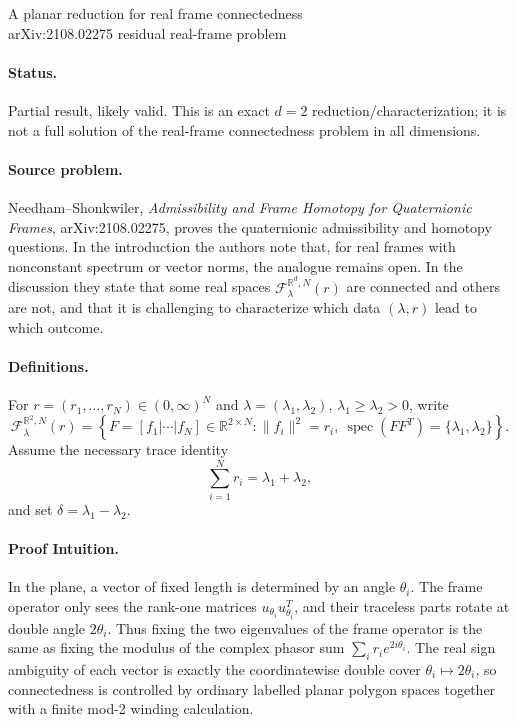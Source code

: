 \documentclass[11pt]{article}
\newcommand{\R}{\mathbb R}
\newcommand{\F}{\mathcal F}
\begin{document}
\begin{center}
{\Large A planar reduction for real frame connectedness}\\[4pt]
{\large arXiv:2108.02275 residual real-frame problem}
\end{center}

\paragraph{Status.}
Partial result, likely valid. This is an exact \(d=2\) reduction/characterization; it is not a full solution of the real-frame connectedness problem in all dimensions.

\paragraph{Source problem.}
Needham--Shonkwiler, \emph{Admissibility and Frame Homotopy for Quaternionic Frames}, arXiv:2108.02275, proves the quaternionic admissibility and homotopy questions. In the introduction the authors note that, for real frames with nonconstant spectrum or vector norms, the analogue remains open. In the discussion they state that some real spaces \(\F^{\R^d,N}_{\lambda}(r)\) are connected and others are not, and that it is challenging to characterize which data \((\lambda,r)\) lead to which outcome.

\paragraph{Definitions.}
For \(r=(r_1,\dots,r_N)\in(0,\infty)^N\) and \(\lambda=(\lambda_1,\lambda_2)\), \(\lambda_1\geq\lambda_2>0\), write
\[
\F^{\R^2,N}_{\lambda}(r)
=
\left\{
F=[f_1|\cdots|f_N]\in\R^{2\times N}:
\|f_i\|^2=r_i,\ \operatorname{spec}(FF^T)=\{\lambda_1,\lambda_2\}
\right\}.
\]
Assume the necessary trace identity
\[
\sum_{i=1}^N r_i=\lambda_1+\lambda_2,
\]
and set \(\delta=\lambda_1-\lambda_2\).

\paragraph{Proof Intuition.}
In the plane, a vector of fixed length is determined by an angle \(\theta_i\). The frame operator only sees the rank-one matrices \(u_{\theta_i}u_{\theta_i}^T\), and their traceless parts rotate at double angle \(2\theta_i\). Thus fixing the two eigenvalues of the frame operator is the same as fixing the modulus of the complex phasor sum \(\sum_i r_i e^{2i\theta_i}\). The real sign ambiguity of each vector is exactly the coordinatewise double cover \(\theta_i\mapsto 2\theta_i\), so connectedness is controlled by ordinary labelled planar polygon spaces together with a finite mod-2 winding calculation.
\end{document}
